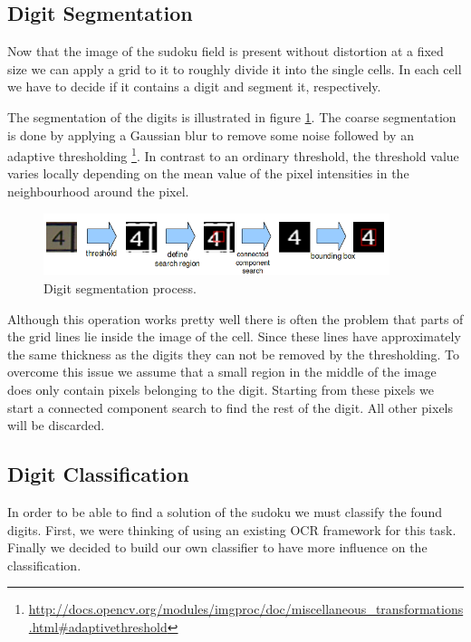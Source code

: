 \documentclass[
a4paper,     %
12pt         %
]{scrartcl}  %
\begin{document}
\subsection{Digit Segmentation}

Now that the image of the sudoku field is present without distortion at a
fixed size we can apply a grid to it to roughly divide it into the single
cells. In each cell we have to decide if it contains a digit and segment
it, respectively.

The segmentation of the digits is illustrated in figure \ref{fig:digit_seg}.
The coarse segmentation is done by applying a Gaussian blur to remove some
noise followed by an adaptive thresholding
\footnote{\url{http://docs.opencv.org/modules/imgproc/doc/miscellaneous_transformations.html\#adaptivethreshold}}. 
In contrast to an ordinary threshold, the threshold value varies locally
depending on the mean value of the pixel intensities in the 
neighbourhood around the pixel.

\begin{figure}
  \centering
  \includegraphics[width=0.9\textwidth]{imgs/segmentation.png}
  \caption{Digit segmentation process.}
  \label{fig:digit_seg}
\end{figure}

Although this operation works pretty well there is often the problem that
parts of the grid lines lie inside the image of the cell. Since these lines
have approximately the same thickness as the digits they can not be removed
by the thresholding. To overcome this issue we assume that a small region
in the middle of the image does only contain pixels belonging to the digit.
Starting from these pixels we start a connected component search to find the
rest of the digit. All other pixels will be discarded.

\subsection{Digit Classification}

In order to be able to find a solution of the sudoku we must classify the
found digits. First, we were thinking of using an existing OCR framework
for this task. Finally we decided to build our own classifier to have more influence
on the classification.
\end{document}
